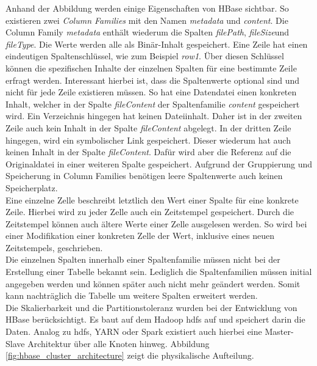 \noindent
Anhand der Abbildung werden einige Eigenschaften von HBase sichtbar. So existieren zwei \textit{Column Families} mit den Namen \textit{metadata} und \textit{content}. Die Column Family \textit{metadata} enthält wiederum die Spalten \textit{filePath}, \textit{fileSize}und \textit{fileType}. Die Werte werden alle als Binär-Inhalt gespeichert. Eine Zeile hat einen eindeutigen Spaltenschlüssel, wie zum Beispiel \textit{row1}. 
Über diesen Schlüssel können die spezifischen Inhalte der einzelnen Spalten für eine bestimmte Zeile erfragt werden. Interessant hierbei ist, dass die Spaltenwerte optional sind und nicht für jede Zeile existieren müssen. So hat eine Datendatei einen konkreten Inhalt, welcher in der Spalte \textit{fileContent} der Spaltenfamilie \textit{content} gespeichert wird. Ein Verzeichnis hingegen hat keinen Dateiinhalt. 
Daher ist in der zweiten Zeile auch kein Inhalt in der Spalte \textit{fileContent} abgelegt. In der dritten Zeile hingegen, wird ein symbolischer Link gespeichert. Dieser wiederum hat auch keinen Inhalt in der Spalte \textit{fileContent}. Dafür wird aber die Referenz auf die Originaldatei in einer weiteren Spalte gespeichert. Aufgrund der Gruppierung und Speicherung in Column Families benötigen leere Spaltenwerte auch keinen Speicherplatz.\\ 
Eine einzelne Zelle beschreibt letztlich den Wert einer Spalte für eine konkrete Zeile. Hierbei wird zu jeder Zelle auch ein Zeitstempel gespeichert. Durch die Zeitstempel können auch ältere Werte einer Zelle ausgelesen werden. 
So wird bei einer Modifikation einer konkreten Zelle der Wert, inklusive eines neuen Zeitstempels, geschrieben.\\
Die einzelnen Spalten innerhalb einer Spaltenfamilie müssen nicht bei der Erstellung einer Tabelle bekannt sein. Lediglich die Spaltenfamilien müssen initial angegeben werden und können später auch nicht mehr geändert werden. Somit kann nachträglich die Tabelle um weitere Spalten erweitert werden.\cite[S. 577]{hadoop_definitive_guide}\\

\noindent
Die Skalierbarkeit und die Partitionstoleranz wurden bei der Entwicklung von HBase berücksichtigt. Es baut auf dem Hadoop \gls{hdfs} auf und speichert darin die Daten. Analog zu \gls{hdfs}, YARN oder Spark existiert auch hierbei eine Master-Slave Architektur über alle Knoten hinweg. Abbildung \ref{fig:hbase_cluster_architecture} zeigt die physikalische Aufteilung.\\

